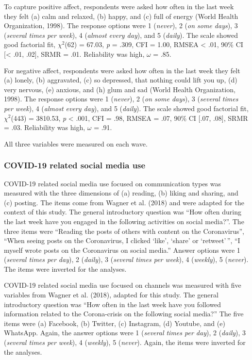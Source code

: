 \documentclass[
  man,floatsintext]{apa7}
\begin{document}
To capture positive affect, respondents were asked how often in the last week they felt (a) calm and relaxed, (b) happy, and (c) full of energy (World Health Organization, 1998).
The response options were 1 (\emph{never}), 2 (\emph{on some days}), 3 (\emph{several times per week}), 4 (\emph{almost every day}), and 5 (\emph{daily}).
The scale showed good factorial fit, \(\chi^2\)(62) = 67.03, \emph{p} = .309, CFI = 1.00, RMSEA \textless{} .01, 90\% CI {[}\textless{} .01, .02{]}, SRMR = .01.
Reliability was high, \(\omega\) = .85.

For negative affect, respondents were asked how often in the last week they felt (a) lonely, (b) aggravated, (c) so depressed, that nothing could lift you up, (d) very nervous, (e) anxious, and (h) glum and sad (World Health Organization, 1998).
The response options were 1 (\emph{never}), 2 (\emph{on some days}), 3 (\emph{several times per week}), 4 (\emph{almost every day}), and 5 (\emph{daily}).
The scale showed good factorial fit, \(\chi^2\)(443) = 3810.53, \emph{p} \textless{} .001, CFI = .98, RMSEA = .07, 90\% CI {[}.07, .08{]}, SRMR = .03.
Reliability was high, \(\omega\) = .91.

All three variables were measured on each wave.

\hypertarget{covid-19-related-social-media-use}{%
\subsubsection{COVID-19 related social media use}\label{covid-19-related-social-media-use}}

COVID-19 related social media use focused on communication types was measured with the three dimensions of (a) reading, (b) liking and sharing, and (c) posting.
The items come from Wagner et al. (2018) and were adapted for the context of this study.
The general introductory question was ``How often during the last week have you engaged in the following activities on social media?''.
The three items were ``Reading the posts of others with content on the Coronavirus'', ``When seeing posts on the Coronavirus, I clicked `like', `share' or `retweet'\,'', ``I myself wrote posts on the Coronavirus on social media.''
Answer options were 1 (\emph{several times per day}), 2 (\emph{daily}), 3 (\emph{several times per week}), 4 (\emph{weekly}), 5 (\emph{never}).
The items were inverted for the analyses.

COVID-19 related social media use focused on channels was measured with five variables from Wagner et al. (2018), adapted for this study.
The general introductory question was ``How often in the last week have you followed information related to the Corona-crisis on the following social media?''
The five items were (a) Facebook, (b) Twitter, (c) Instagram, (d) Youtube, and (e) WhatsApp.
Again, the answer options were 1 (\emph{several times per day}), 2 (\emph{daily}), 3 (\emph{several times per week}), 4 (\emph{weekly}), 5 (\emph{never}).
Again, the items were inverted for the analyses.
\end{document}
